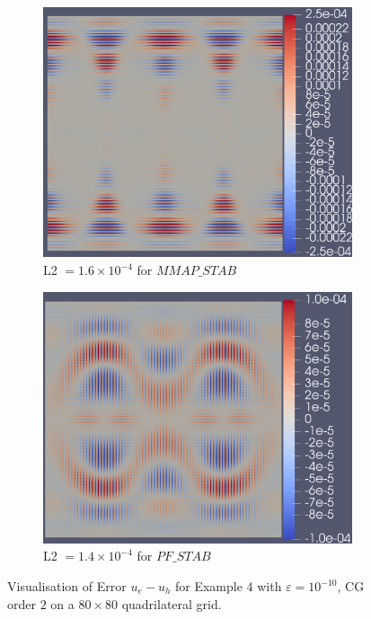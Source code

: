 \documentclass[12pt]{ociamthesis}
\begin{document}
\begin{figure}[H]
 \begin{subfigure}{0.5\textwidth}
     \includegraphics[width=\textwidth]{Pics/ErrorPlots/E4_MMAP_STAB.png}
     \caption{L2 $=1.6\times10^{-4}$ for $MMAP\_STAB$}
 \end{subfigure}
   \begin{subfigure}{0.5\textwidth}
     \includegraphics[width=\textwidth]{Pics/ErrorPlots/E4_PF_STAB.png}
     \caption{L2 $=1.4\times10^{-4}$ for $PF\_STAB$}
 \end{subfigure}
 \caption{Visualisation of Error $u_e-u_h$ for Example $4$ with $\varepsilon = 10^{-10}$, CG order $2$ on a $80 \times 80$ quadrilateral grid.} \label{E4_Error}
\end{figure}
\end{document}
